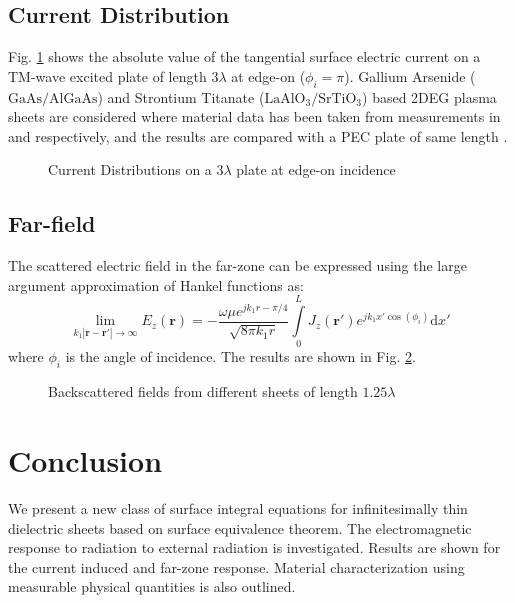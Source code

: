 \documentclass[conference, 10pt]{IEEEtran}
\renewcommand{\v}[1]{\mathbf{#1}} %
\renewcommand{\O}{\omega}  %
\renewcommand{\u}{\mu}  %
\renewcommand{\inf}{\infty}  %
\renewcommand{\^}{\hat}  %
\begin{document}
\subsection{Current Distribution}
%
Fig. \ref{fig:edgeon} shows the absolute value of the tangential surface electric current on a TM-wave excited plate of length $3 \lambda$ at edge-on ($\phi_i = \pi$). Gallium Arsenide ($\mathrm{GaAs}/\mathrm{AlGaAs}$) and Strontium Titanate ($\mathrm{LaAlO_3}/\mathrm{SrTiO_3}$) based 2DEG plasma sheets are considered where material data has been taken from measurements in \cite{burke2000high} and \cite{herranz2012high} respectively, and the results are compared with a PEC plate of same length \cite{senior1979backscattering}.

%
\begin{figure}[h]
  \normalsize
  \centering
  
  \caption{Current Distributions on a $3\lambda$ plate at edge-on incidence}
  \label{fig:edgeon}
\end{figure}
%
%   
%
\subsection{Far-field}
%
The scattered electric field in the far-zone can be expressed using the large argument approximation of Hankel functions as:
%
\begin{equation}
  \lim_{k_1|\v r - \v r'|\to\inf} E_z(\v r) = -\frac{\O \u e^{j k_1 r - \pi/4}}{\sqrt{8 \pi k_1 r}}\int \limits_{0}^{L} J_z(\v r') e^{j k_1 x' \cos(\phi_i)} \mathrm{d}x'
  \label{eq:far-field}
\end{equation}
%
where $\phi_i$ is the angle of incidence. The results are shown in Fig. \ref{fig:rcs}.
%
\begin{figure}[h]
  \centering
  
  \caption{Backscattered fields from different sheets of length $1.25\lambda$}
  \label{fig:rcs}
\end{figure}
%
\section{Conclusion}
%
We present a new class of surface integral equations for infinitesimally thin dielectric sheets based on surface equivalence theorem. The electromagnetic response to radiation to external radiation is investigated. Results are shown for the current induced and far-zone response. Material characterization using measurable physical quantities is also outlined.
%


\end{document}
